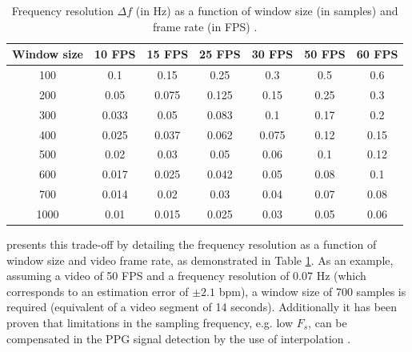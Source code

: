 \begin{table}[h!]
\caption{Frequency resolution $\Delta f$ (in Hz) as a function of window size (in samples) and frame rate (in FPS) \parencite{roald2013estimation}.}
\label{table:frequency-resolution}
\centering
\begin{tabular}{ccccccc}%
\toprule%
\textbf{Window size} & \textbf{10 FPS} & \textbf{15 FPS} & \textbf{25 FPS} & \textbf{30 FPS} & \textbf{50 FPS} & \textbf{60 FPS} \\
\midrule
100 & 0.1 & 0.15 & 0.25 & 0.3 & 0.5 & 0.6 \\
200 & 0.05 & 0.075 & 0.125 & 0.15 & 0.25 & 0.3 \\
300 & 0.033 & 0.05 & 0.083 & 0.1 & 0.17 & 0.2 \\
400 & 0.025 & 0.037 & 0.062 & 0.075 & 0.12 & 0.15 \\
500 & 0.02 & 0.03 & 0.05 & 0.06 & 0.1 & 0.12 \\
600 & 0.017 & 0.025 & 0.042 & 0.05 & 0.08 & 0.1 \\
700 & 0.014 & 0.02 & 0.03 & 0.04 & 0.07 & 0.08 \\
1000 & 0.01 & 0.015 & 0.025 & 0.03 & 0.05 & 0.06 \\
\bottomrule%
\end{tabular}%
\end{table}

\textcite{roald2013estimation} presents this trade-off by detailing the frequency resolution as a function of window size and video frame rate, as demonstrated in Table \ref{table:frequency-resolution}. As an example, assuming a video of 50 FPS and a frequency resolution of 0.07 Hz (which corresponds to an estimation error of $\pm 2.1$ bpm), a window size of 700 samples is required (equivalent of a video segment of 14 seconds). Additionally it has been proven that limitations in the sampling frequency, e.g. low $F_s$, can be compensated in the PPG signal detection by the use of interpolation \parencite{sun2012noncontact}.
